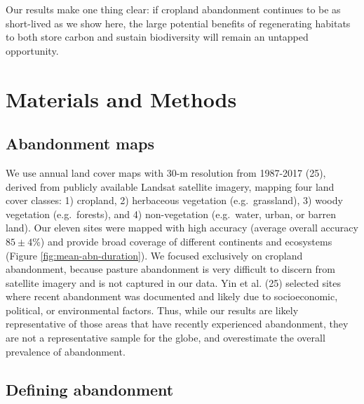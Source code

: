 \documentclass[9pt,twocolumn,twoside,]{pnas-new}
\begin{document}
Our results make one thing clear: if cropland abandonment continues to
be as short-lived as we show here, the large potential benefits of
regenerating habitats to both store carbon and sustain biodiversity will
remain an untapped opportunity.

\hypertarget{methods}{%
\section{Materials and Methods}\label{methods}}

\hypertarget{abandonment-maps}{%
\subsection{Abandonment maps}\label{abandonment-maps}}

We use annual land cover maps with 30-m resolution from 1987-2017 (25),
derived from publicly available Landsat satellite imagery, mapping four
land cover classes: 1) cropland, 2) herbaceous vegetation
(e.g.~grassland), 3) woody vegetation (e.g.~forests), and 4)
non-vegetation (e.g.~water, urban, or barren land). Our eleven sites
were mapped with high accuracy (average overall accuracy \(85\pm4\)\%)
and provide broad coverage of different continents and ecosystems
(Figure \ref{fig:mean-abn-duration}). We focused exclusively on cropland
abandonment, because pasture abandonment is very difficult to discern
from satellite imagery and is not captured in our data. Yin et al. (25)
selected sites where recent abandonment was documented and likely due to
socioeconomic, political, or environmental factors. Thus, while our
results are likely representative of those areas that have recently
experienced abandonment, they are not a representative sample for the
globe, and overestimate the overall prevalence of abandonment.

\hypertarget{defining-abandonment}{%
\subsection{Defining abandonment}\label{defining-abandonment}}
\end{document}
